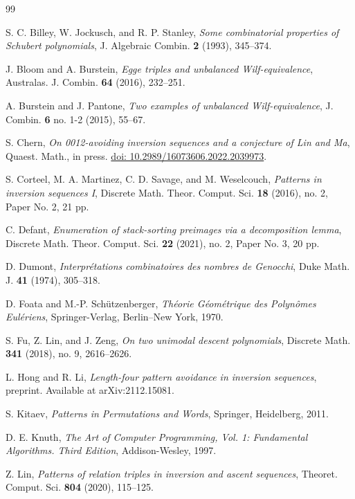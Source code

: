 \documentclass[reqno]{amsart}
\numberwithin{equation}{section}
\theoremstyle{plain}
\theoremstyle{definition}
\theoremstyle{named}
\newcommand{\doi}[1]{\href{http://dx.doi.org/#1}{doi: #1}}
\begin{document}

\begin{thebibliography}{99}

	{\sc S. C. Billey, W. Jockusch, and R. P. Stanley}, {\em Some combinatorial properties of Schubert polynomials}, J. Algebraic Combin. {\bf2} (1993), 345--374.

	{\sc J. Bloom and A. Burstein}, {\em Egge triples and unbalanced Wilf-equivalence}, Australas. J. Combin. {\bf64} (2016), 232--251.

	{\sc A. Burstein and J. Pantone}, {\em Two examples of unbalanced Wilf-equivalence}, J. Combin. {\bf6} no. 1-2 (2015), 55--67.

	{\sc S. Chern}, {\em On 0012-avoiding inversion sequences and a conjecture of Lin and Ma}, Quaest. Math., in press. \doi{10.2989/16073606.2022.2039973}.
	
	{\sc S. Corteel, M. A. Martinez, C. D. Savage, and M. Weselcouch}, {\em Patterns in inversion sequences I}, Discrete Math. Theor. Comput. Sci. {\bf18} (2016), no. 2, Paper No. 2, 21 pp.

	{\sc C. Defant}, {\em Enumeration of stack-sorting preimages via a decomposition lemma}, Discrete Math. Theor. Comput. Sci. {\bf22} (2021), no. 2, Paper No. 3, 20 pp.
	
	{\sc D. Dumont}, {\em Interpr\'etations combinatoires des nombres de Genocchi}, Duke Math. J. {\bf41} (1974), 305--318.

	
	
	
	{\sc D. Foata and M.-P. Sch\"utzenberger}, {\em Th\'eorie G\'eom\'etrique des Polyn\^omes Eul\'eriens}, Springer-Verlag, Berlin--New York, 1970.
	
	{\sc S. Fu, Z. Lin, and J. Zeng}, {\em On two unimodal descent polynomials}, Discrete Math. {\bf341} (2018), no. 9, 2616--2626.
	
	{\sc L. Hong and R. Li}, {\em Length-four pattern avoidance in inversion sequences}, preprint. Available at arXiv:2112.15081.
	
	{\sc S. Kitaev}, {\em Patterns in Permutations and Words}, Springer, Heidelberg, 2011.
	
	{\sc D. E. Knuth}, {\em The Art of Computer Programming, Vol. 1: Fundamental Algorithms. Third Edition}, Addison-Wesley, 1997.

	{\sc Z. Lin}, {\em Patterns of relation triples in inversion and ascent sequences}, Theoret. Comput. Sci. {\bf804} (2020), 115--125.


\end{thebibliography}
\end{document}
